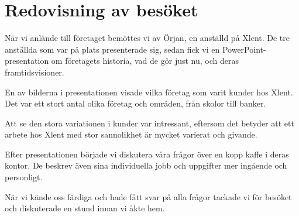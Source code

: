 \documentclass[../report.tex]{subfiles}
\begin{document}
    \chapter{Redovisning av besöket}
    När vi anlände till företaget bemöttes vi av Örjan, en anställd på Xlent. De tre anställda som var på plats presenterade sig, sedan fick vi en PowerPoint-presentation om företagets historia, vad de gör just nu, och deras framtidsvisioner.
    
    En av bilderna i presentationen visade vilka företag som varit kunder hos Xlent. Det var ett stort antal olika företag och områden, från skolor till banker.
    
    Att se den stora variationen i kunder var intressant, eftersom det betyder att ett arbete hos Xlent med stor sannolikhet är mycket varierat och givande.
    
    Efter presentationen började vi diskutera våra frågor över en kopp kaffe i deras kontor. De beskrev även sina individuella jobb och uppgifter mer ingående och personligt.
    
    När vi kände oss färdiga och hade fått svar på alla frågor tackade vi för besöket och diskuterade en stund innan vi åkte hem.
\end{document}
